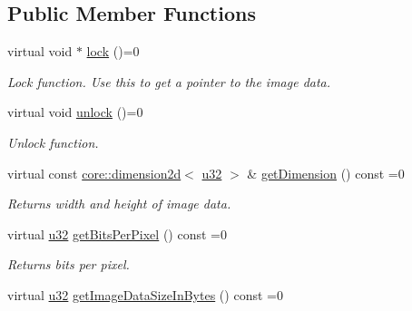 \subsection*{Public Member Functions}
\begin{DoxyCompactItemize}
\item 
virtual void $\ast$ \hyperlink{classirr_1_1video_1_1IImage_a5c4b0b5fa2a5f253f93c1b038e20d204}{lock} ()=0
\begin{DoxyCompactList}\small\item\em Lock function. Use this to get a pointer to the image data. \end{DoxyCompactList}\item 
virtual void \hyperlink{classirr_1_1video_1_1IImage_ad0f902d74a948ee66be2d70dc90ed38d}{unlock} ()=0
\begin{DoxyCompactList}\small\item\em Unlock function. \end{DoxyCompactList}\item 
virtual const \hyperlink{classirr_1_1core_1_1dimension2d}{core\+::dimension2d}$<$ \hyperlink{namespaceirr_a0416a53257075833e7002efd0a18e804}{u32} $>$ \& \hyperlink{classirr_1_1video_1_1IImage_a407b43a35787e35217a236de738047ec}{get\+Dimension} () const  =0\hypertarget{classirr_1_1video_1_1IImage_a407b43a35787e35217a236de738047ec}{}\label{classirr_1_1video_1_1IImage_a407b43a35787e35217a236de738047ec}

\begin{DoxyCompactList}\small\item\em Returns width and height of image data. \end{DoxyCompactList}\item 
virtual \hyperlink{namespaceirr_a0416a53257075833e7002efd0a18e804}{u32} \hyperlink{classirr_1_1video_1_1IImage_a729c4224a6ac60350b8ff5e04461beb8}{get\+Bits\+Per\+Pixel} () const  =0\hypertarget{classirr_1_1video_1_1IImage_a729c4224a6ac60350b8ff5e04461beb8}{}\label{classirr_1_1video_1_1IImage_a729c4224a6ac60350b8ff5e04461beb8}

\begin{DoxyCompactList}\small\item\em Returns bits per pixel. \end{DoxyCompactList}\item 
virtual \hyperlink{namespaceirr_a0416a53257075833e7002efd0a18e804}{u32} \hyperlink{classirr_1_1video_1_1IImage_a2143205d060b93ce05163e1aa9b807ba}{get\+Image\+Data\+Size\+In\+Bytes} () const  =0\hypertarget{classirr_1_1video_1_1IImage_a2143205d060b93ce05163e1aa9b807ba}{}\label{classirr_1_1video_1_1IImage_a2143205d060b93ce05163e1aa9b807ba}


\end{DoxyCompactItemize}
